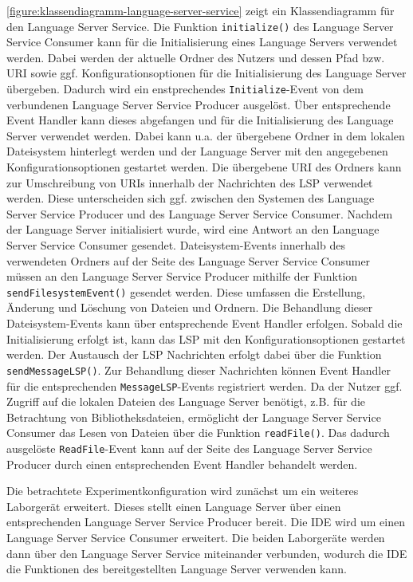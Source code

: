 \autoref{figure:klassendiagramm-language-server-service} zeigt ein Klassendiagramm für den Language Server Service. Die Funktion \texttt{initialize()} des Language Server Service Consumer kann für die Initialisierung eines Language Servers verwendet werden. Dabei werden der aktuelle Ordner des Nutzers und dessen Pfad bzw. URI sowie ggf. Konfigurationsoptionen für die Initialisierung des Language Server übergeben. Dadurch wird ein enstprechendes \texttt{Initialize}-Event von dem verbundenen Language Server Service Producer ausgelöst. Über entsprechende Event Handler kann dieses abgefangen und für die Initialisierung des Language Server verwendet werden. Dabei kann u.a. der übergebene Ordner in dem lokalen Dateisystem hinterlegt werden und der Language Server mit den angegebenen Konfigurationsoptionen gestartet werden. Die übergebene URI des Ordners kann zur Umschreibung von URIs innerhalb der Nachrichten des \ac{LSP} verwendet werden. Diese unterscheiden sich ggf. zwischen den Systemen des Language Server Service Producer und des Language Server Service Consumer. Nachdem der Language Server initialisiert wurde, wird eine Antwort an den Language Server Service Consumer gesendet. Dateisystem-Events innerhalb des verwendeten Ordners auf der Seite des Language Server Service Consumer müssen an den Language Server Service Producer mithilfe der Funktion \texttt{sendFilesystemEvent()} gesendet werden. Diese umfassen die Erstellung, Änderung und Löschung von Dateien und Ordnern. Die Behandlung dieser Dateisystem-Events kann über entsprechende Event Handler erfolgen. Sobald die Initialisierung erfolgt ist, kann das \ac{LSP} mit den Konfigurationsoptionen gestartet werden. Der Austausch der \ac{LSP} Nachrichten erfolgt dabei über die Funktion \texttt{sendMessageLSP()}. Zur Behandlung dieser Nachrichten können Event Handler für die entsprechenden \texttt{MessageLSP}-Events registriert werden. Da der Nutzer ggf. Zugriff auf die lokalen Dateien des Language Server benötigt, z.B. für die Betrachtung von Bibliotheksdateien, ermöglicht der Language Server Service Consumer das Lesen von Dateien über die Funktion \texttt{readFile()}. Das dadurch ausgelöste \texttt{ReadFile}-Event kann auf der Seite des Language Server Service Producer durch einen entsprechenden Event Handler behandelt werden.

Die betrachtete Experimentkonfiguration wird zunächst um ein weiteres Laborgerät erweitert. Dieses stellt einen Language Server über einen entsprechenden Language Server Service Producer bereit. Die IDE wird um einen Language Server Service Consumer erweitert. Die beiden Laborgeräte werden dann über den Language Server Service miteinander verbunden, wodurch die IDE die Funktionen des bereitgestellten Language Server verwenden kann.